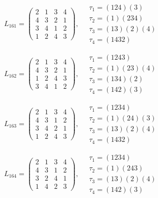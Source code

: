$L_{161} = \begin{pmatrix} 2 & 1 & 3 & 4 \\ 4 & 3 & 2 & 1 \\ 3 & 4 & 1 & 2 \\ 1 & 2 & 4 & 3 \end{pmatrix}, \quad \begin{matrix} \tau_{1} = (1 2 4)(3) \\ \tau_{2} = (1)(2 3 4) \\ \tau_{3} = (1 3)(2)(4) \\ \tau_{4} = (1 4 3 2) \end{matrix}$

$L_{162} = \begin{pmatrix} 2 & 1 & 3 & 4 \\ 4 & 3 & 2 & 1 \\ 1 & 2 & 4 & 3 \\ 3 & 4 & 1 & 2 \end{pmatrix}, \quad \begin{matrix} \tau_{1} = (1 2 4 3) \\ \tau_{2} = (1)(2 3)(4) \\ \tau_{3} = (1 3 4)(2) \\ \tau_{4} = (1 4 2)(3) \end{matrix}$

$L_{163} = \begin{pmatrix} 2 & 1 & 3 & 4 \\ 4 & 3 & 1 & 2 \\ 3 & 4 & 2 & 1 \\ 1 & 2 & 4 & 3 \end{pmatrix}, \quad \begin{matrix} \tau_{1} = (1 2 3 4) \\ \tau_{2} = (1)(2 4)(3) \\ \tau_{3} = (1 3)(2)(4) \\ \tau_{4} = (1 4 3 2) \end{matrix}$

$L_{164} = \begin{pmatrix} 2 & 1 & 3 & 4 \\ 4 & 3 & 1 & 2 \\ 3 & 2 & 4 & 1 \\ 1 & 4 & 2 & 3 \end{pmatrix}, \quad \begin{matrix} \tau_{1} = (1 2 3 4) \\ \tau_{2} = (1)(2 4 3) \\ \tau_{3} = (1 3)(2)(4) \\ \tau_{4} = (1 4 2)(3) \end{matrix}$

